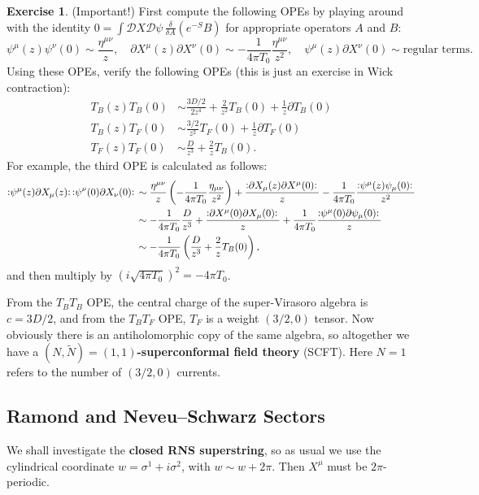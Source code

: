 \documentclass{report}
\theoremstyle{plain}
\theoremstyle{definition}
\newtheorem{exercise}{Exercise}[section]
\theoremstyle{remark}
\newcommand{\di}{\partial}
\newcommand{\NO}[1]{\vcentcolon\mathrel{#1}\vcentcolon\,}
\newcommand{\cD}{\mathcal{D}}
\newcommand{\fder}[2]{\frac{\delta #1}{\delta #2}}
\begin{document}
\begin{exercise} (Important!)
  First compute the following OPEs by playing around with the identity
  $0 = \int \cD X \cD \psi \, \fder{}{A} (e^{-S} B)$ for appropriate
  operators $A$ and $B$:
  \[ \psi^\mu(z) \psi^\nu(0) \sim \frac{\eta^{\mu\nu}}{z}, \quad \di X^\mu(z) \di X^\nu(0) \sim -\frac{1}{4\pi T_0} \frac{\eta^{\mu\nu}}{z^2}, \quad \psi^\mu(z) \di X^\nu(0) \sim \text{regular terms}. \]
  Using these OPEs, verify the following OPEs (this is just an
  exercise in Wick contraction):
  \begin{align*}
    T_B(z) T_B(0) &\sim \frac{3D/2}{2z^4} + \frac{2}{z^2} T_B(0) + \frac{1}{z} \di T_B(0) \\
    T_B(z) T_F(0) &\sim \frac{3/2}{z^2} T_F(0) + \frac{1}{z} \di T_F(0) \\
    T_F(z) T_F(0) &\sim \frac{D}{z^3} + \frac{2}{z} T_B(0).
  \end{align*}
  For example, the third OPE is calculated as follows:
  \begin{align*}
    \NO{\psi^\mu (z) \di X_\mu(z)} \NO{\psi^\nu (0) \di X_\nu(0)}
    &\sim \frac{\eta^{\mu\nu}}{z} \left(-\frac{1}{4\pi T_0}\frac{\eta_{\mu\nu}}{z^2}\right) + \frac{\NO{\di X_\mu(z) \di X^\mu(0)}}{z} - \frac{1}{4\pi T_0} \frac{\NO{\psi^\mu(z) \psi_\mu(0)}}{z^2} \\
    &\sim -\frac{1}{4\pi T_0} \frac{D}{z^3} + \frac{\NO{\di X^\mu(0) \di X_\mu(0)}}{z} + \frac{1}{4\pi T_0} \frac{\NO{\psi^\mu(0) \di\psi_\mu(0)}}{z} \\
    &\sim -\frac{1}{4\pi T_0} \left(\frac{D}{z^3} + \frac{2}{z} T_B(0)\right),
  \end{align*}
  and then multiply by $(i\sqrt{4\pi T_0})^2 = -4\pi T_0$.
\end{exercise}

From the $T_B T_B$ OPE, the central charge of the super-Virasoro
algebra is $c = 3D/2$, and from the $T_B T_F$ OPE, $T_F$ is a weight
$(3/2, 0)$ tensor. Now obviously there is an antiholomorphic copy of
the same algebra, so altogether we have a {\bf $(N, \tilde{N}) = (1,
  1)$-superconformal field theory} (SCFT). Here $N = 1$ refers to the
number of $(3/2, 0)$ currents.

\subsection{Ramond and Neveu--Schwarz Sectors}

We shall investigate the {\bf closed RNS superstring}, so as usual we
use the cylindrical coordinate $w = \sigma^1 + i\sigma^2$, with $w
\sim w + 2\pi$. Then $X^\mu$ must be $2\pi$-periodic.
\end{document}

